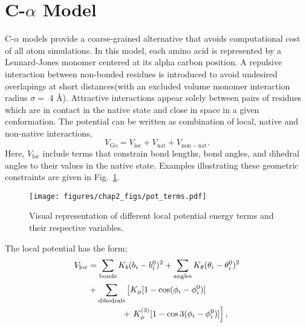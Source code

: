 \documentclass[../talant.diss.submit.tex]{subfiles}
\begin{document}
\section{\textbf{C-$\alpha$ Model}}\label{sect:two_two}
\noindent
C-$\alpha$ models provide a coarse-grained alternative that avoids computational cost of all atom
simulations. In this model, each amino acid is represented by a Lennard-Jones monomer centered at
its alpha carbon position.
A repulsive interaction between non-bonded residues is introduced to avoid undesired overlapings at
short distances(with an excluded volume monomer interaction radius $\sigma=$ 4 \AA).
Attractive interactions appear solely between pairs of residues which are in contact
in the native state and close in space in a given conformation.
The potential can be written as combination of local, native and non-native interactions,
\begin{equation}
  V_{\mathrm{Go}}= V_{\mathrm{loc}} +
  V_{\mathrm{nat}}+V_{\mathrm{non-nat}}. 
\end{equation}
Here, $V_\mathrm{loc}$ include terms that constrain  bond lengths, bond angles, and dihedral angles
to their values in the native state. Examples illustrating these geometric constraints
are given in Fig.~\ref{fig:pot_terms}.
%
%
\begin{figure}[htp!]
  \begin{centering}
    \texttt{[image: figures/chap2\_figs/pot\_terms.pdf]}
    \caption{Visual representation of different local potential energy terms and their respective
    variables.}
    \label{fig:pot_terms}
  \end{centering}
\end{figure}
%
%
%
The local potential has the form;
%
%
\begin{align}
  \label{eq:local}
  V_{\mathrm{loc}} & = \sum_{\mathrm{bonds}}K_{b} (b_{i} -
  b_{i}^0)^{2}  + \sum_{\mathrm{angles}} K_{\theta} (\theta_{i}
  - \theta_{i}^0)^{2} \nonumber \\ &
  +\sum_{\mathrm{dihedrals}} \left[ K_{\phi}[ 1 - \cos (\phi_{i}
      - \phi_{i}^0) ] \right.\nonumber \\ &  \mbox{\hspace{4em}} +
    \left. K_{\phi}^{(3)}[1 - \cos 3(\phi_{i} - \phi_{i}^0)]\right],
  \nonumber \\
\end{align}
\end{document}
